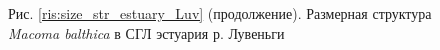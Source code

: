 \documentclass[12pt, a4paper]{article}
\begin{document}
\begin{figure}[h]


\begin{center}
Рис. \ref{ris:size_str_estuary_Luv} (продолжение). Размерная структура {\it Macoma balthica} в СГЛ эстуария р. Лувеньги

\end{center}
\end{figure}
\end{document}
